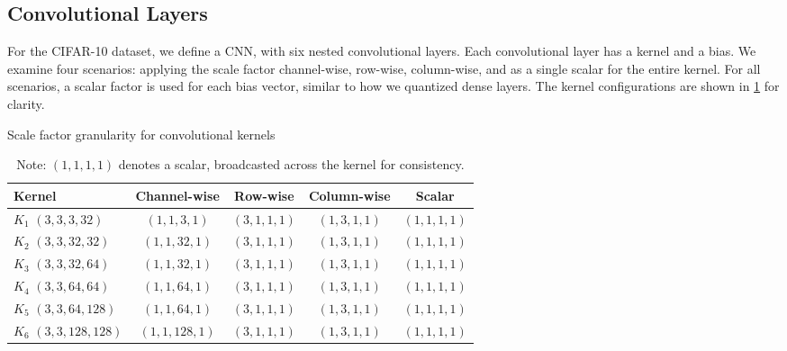 
\subsection{Convolutional Layers}
\label{subsec:convolutionallayers}
\hspace*{1em}For the CIFAR-10 dataset, we define a CNN, with six nested convolutional layers. 
Each convolutional layer has a kernel and a bias. We examine four scenarios:
applying the scale factor channel-wise, row-wise, column-wise, and as a single
scalar for the entire kernel. For all scenarios, a scalar factor is used for each 
bias vector, similar to how we quantized dense layers. The kernel configurations are shown in
\cref{tab:scalefactorgranularityconv} for clarity.

\begin{table}[t!]
  \centering
  \scriptsize
  \caption{Scale factor granularity for convolutional kernels}
  \label{tab:scalefactorgranularityconv}
  \begin{tabular}{lcccc}
    \toprule
    \textbf{Kernel}                      & \textbf{Channel-wise} & \textbf{Row-wise} & \textbf{Column-wise} & \textbf{Scalar} \\ 
    \midrule
    \( K_{1} \) \( (3, 3, 3, 32) \)     & \( (1, 1, 3, 1) \) & \( (3, 1, 1, 1) \) & \( (1, 3, 1, 1) \) & \( (1, 1, 1, 1) \) \\ 
    \( K_{2} \) \( (3, 3, 32, 32) \)    & \( (1, 1, 32, 1) \) & \( (3, 1, 1, 1) \) & \( (1, 3, 1, 1) \) & \( (1, 1, 1, 1) \) \\ 
    \( K_{3} \) \( (3, 3, 32, 64) \)    & \( (1, 1, 32, 1) \) & \( (3, 1, 1, 1) \) & \( (1, 3, 1, 1) \) & \( (1, 1, 1, 1) \) \\ 
    \( K_{4} \) \( (3, 3, 64, 64) \)    & \( (1, 1, 64, 1) \) & \( (3, 1, 1, 1) \) & \( (1, 3, 1, 1) \) & \( (1, 1, 1, 1) \) \\ 
    \( K_{5} \) \( (3, 3, 64, 128) \)   & \( (1, 1, 64, 1) \) & \( (3, 1, 1, 1) \) & \( (1, 3, 1, 1) \) & \( (1, 1, 1, 1) \) \\ 
    \( K_{6} \) \( (3, 3, 128, 128) \)  & \( (1, 1, 128, 1) \) & \( (3, 1, 1, 1) \) & \( (1, 3, 1, 1) \) & \( (1, 1, 1, 1) \) \\ 
    \bottomrule
  \end{tabular}
  \vspace{0.5em}
  \caption*{\footnotesize Note: \( (1, 1, 1, 1) \) denotes a scalar, broadcasted across the kernel for consistency.}
\end{table}

